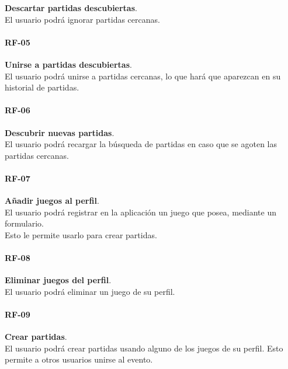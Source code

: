                 \textbf{Descartar partidas descubiertas}. \\
                El usuario podrá ignorar partidas cercanas.

            \paragraph{RF-05}

                \textbf{Unirse a partidas descubiertas}. \\
                El usuario podrá unirse a partidas cercanas, lo que hará que aparezcan en su historial de partidas.

            \paragraph{RF-06}

                \textbf{Descubrir nuevas partidas}. \\
                El usuario podrá recargar la búsqueda de partidas en caso que se agoten las partidas cercanas.

            \paragraph{RF-07}

                \textbf{Añadir juegos al perfil}. \\
                El usuario podrá registrar en la aplicación un juego que posea, mediante un formulario. \\
                Esto le permite usarlo para crear partidas.

            \paragraph{RF-08}

                \textbf{Eliminar juegos del perfil}. \\
                El usuario podrá eliminar un juego de su perfil.

            \paragraph{RF-09}

                \textbf{Crear partidas}. \\
                El usuario podrá crear partidas usando alguno de los juegos de su perfil. Esto permite a otros usuarios unirse al evento.

